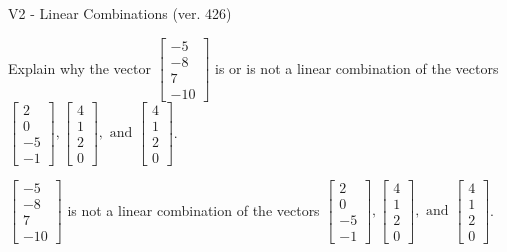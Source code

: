 \begin{exercise}
  \begin{exerciseTitle}V2 - Linear Combinations (ver. 426)\end{exerciseTitle}
  \begin{exerciseStatement}
    Explain why the vector \(\left[\begin{array}{c}
-5 \\
-8 \\
7 \\
-10
\end{array}\right]\)  is or is not a linear 
	combination of the vectors \(\left[\begin{array}{c}
2 \\
0 \\
-5 \\
-1
\end{array}\right] , \left[\begin{array}{c}
4 \\
1 \\
2 \\
0
\end{array}\right] , \text{ and } \left[\begin{array}{c}
4 \\
1 \\
2 \\
0
\end{array}\right]\).
	


  \end{exerciseStatement}
  \begin{exerciseAnswer}
   \(\left[\begin{array}{c}
-5 \\
-8 \\
7 \\
-10
\end{array}\right]\) 
  	 is not  
	a linear combination of the vectors \(\left[\begin{array}{c}
2 \\
0 \\
-5 \\
-1
\end{array}\right] , \left[\begin{array}{c}
4 \\
1 \\
2 \\
0
\end{array}\right] , \text{ and } \left[\begin{array}{c}
4 \\
1 \\
2 \\
0
\end{array}\right]\).

	
  


  \end{exerciseAnswer}
\end{exercise}